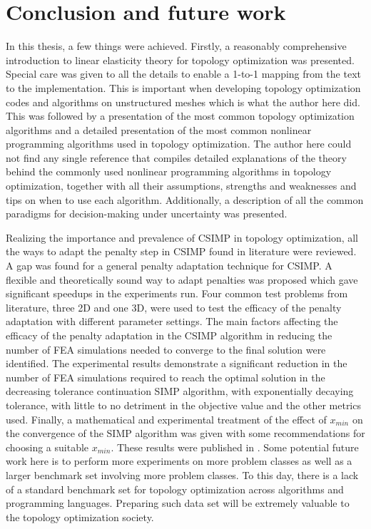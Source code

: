 \chapter{Conclusion and future work}\thispagestyle{EmptyHeader}
\label{chp:5}

In this thesis, a few things were achieved. Firstly, a reasonably comprehensive introduction to linear elasticity theory for topology optimization was presented. Special care was given to all the details to enable a 1-to-1 mapping from the text to the implementation. This is important when developing topology optimization codes and algorithms on unstructured meshes which is what the author here did. This was followed by a presentation of the most common topology optimization algorithms and a detailed presentation of the most common nonlinear programming algorithms used in topology optimization. The author here could not find any single reference that compiles detailed explanations of the theory behind the commonly used nonlinear programming algorithms in topology optimization, together with all their assumptions, strengths and weaknesses and tips on when to use each algorithm. Additionally, a description of all the common paradigms for decision-making under uncertainty was presented.

Realizing the importance and prevalence of CSIMP in topology optimization, all the ways to adapt the penalty step in CSIMP found in literature were reviewed. A gap was found for a general penalty adaptation technique for CSIMP. A flexible and theoretically sound way to adapt penalties was proposed which gave significant speedups in the experiments run. Four common test problems from literature, three 2D and one 3D, were used to test the efficacy of the penalty adaptation with different parameter settings. The main factors affecting the efficacy of the penalty adaptation in the CSIMP algorithm in reducing the number of FEA simulations needed to converge to the final solution were identified. The experimental results demonstrate a significant reduction in the number of FEA simulations required to reach the optimal solution in the decreasing tolerance continuation SIMP algorithm, with exponentially decaying tolerance, with little to no detriment in the objective value and the other metrics used. Finally, a mathematical and experimental treatment of the effect of $x_{min}$ on the convergence of the SIMP algorithm was given with some recommendations for choosing a suitable $x_{min}$. These results were published in \cite{TAREK2020112880}. Some potential future work here is to perform more experiments on more problem classes as well as a larger benchmark set involving more problem classes. To this day, there is a lack of a standard benchmark set for topology optimization across algorithms and programming languages. Preparing such data set will be extremely valuable to the topology optimization society.

